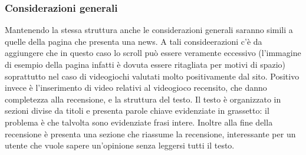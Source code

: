 \documentclass[../ProgettoTecWeb2.tex]{subfiles}
\begin{document}
		\subsubsection{Considerazioni generali}
		Mantenendo la stessa struttura anche le considerazioni generali saranno simili a quelle della pagina che presenta una news. A tali consideerazioni c'è da aggiungere che in questo caso lo scroll può essere veramente eccessivo (l'immagine di esempio della pagina infatti è dovuta essere ritagliata per motivi di spazio) soprattutto nel caso di videogiochi valutati molto positivamente dal sito. Positivo invece è l'inserimento di video relativi al videogioco recensito, che danno completezza alla recensione, e la struttura del testo. Il testo è organizzato in sezioni divise da titoli e presenta parole chiave evidenziate in grassetto: il problema è che talvolta sono evidenziate frasi intere. Inoltre alla fine della recensione è presenta una sezione che riassume la recensione, interessante per un utente che vuole sapere un'opinione senza leggersi tutti il testo.
\end{document}

